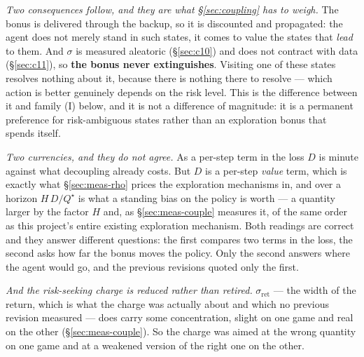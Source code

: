 \documentclass{article}
\newcommand{\sret}{\sigma_{\mathrm{ret}}}
\newcommand{\srank}{\sigma}
\begin{document}
\begin{itemize}
  \emph{Two consequences follow, and they are what \S\ref{sec:coupling} has to weigh.} The bonus
  is delivered through the backup, so it is discounted and propagated: the agent does not merely
  stand in such states, it comes to value the states that \emph{lead} to them. And $\srank$ is
  measured aleatoric (\S\ref{sec:c10}) and does not contract with data (\S\ref{sec:c11}), so
  \textbf{the bonus never extinguishes}. Visiting one of these states resolves nothing about it,
  because there is nothing there to resolve --- which action is better genuinely depends on the
  risk level. This is the difference between it and family (I) below, and it is not a difference
  of magnitude: it is a permanent preference for risk-ambiguous states rather than an exploration
  bonus that spends itself.

  \emph{Two currencies, and they do not agree.} As a per-step term in the loss $D$ is minute
  against what decoupling already costs. But $D$ is a per-step \emph{value} term, which is exactly
  what \S\ref{sec:meas-rho} prices the exploration mechanisms in, and over a horizon $H\,D/Q^\star$
  is what a standing bias on the policy is worth --- a quantity larger by the factor $H$ and, as
  \S\ref{sec:meas-couple} measures it, of the same order as this project's entire existing
  exploration mechanism. Both readings are correct and they answer different questions: the first
  compares two terms in the loss, the second asks how far the bonus moves the policy. Only the
  second answers where the agent would go, and the previous revisions quoted only the first.

  \emph{And the risk-seeking charge is reduced rather than retired.} $\sret$ --- the width of the
  return, which is what the charge was actually about and which no previous revision measured ---
  does carry some concentration, slight on one game and real on the other
  (\S\ref{sec:meas-couple}). So the charge was aimed at the wrong quantity on one game and at a
  weakened version of the right one on the other.


\end{itemize}
\end{document}
